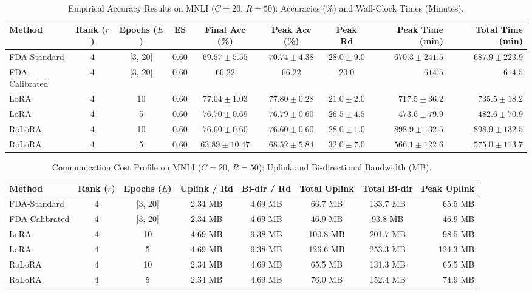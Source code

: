 \documentclass[10pt,a4paper]{article}
\begin{document}
\begin{table}[H]
\centering
\caption{Empirical Accuracy Results on MNLI ($C=20$, $R=50$): Accuracies (\%) and Wall-Clock Times (Minutes).}
\scriptsize
\setlength{\tabcolsep}{3.5pt}
\begin{tabular*}{\textwidth}{@{\extracolsep{\fill}}lccccccrr@{}}
\toprule
\textbf{Method} & \textbf{Rank ($r$)} & \textbf{Epochs ($E$)} & \textbf{ES} & \textbf{Final Acc (\%)} & \textbf{Peak Acc (\%)} & \textbf{Peak Rd} & \textbf{Peak Time (min)} & \textbf{Total Time (min)} \\
\midrule
FDA-Standard & 4 & [3, 20] & 0.60 & $69.57 \pm 5.55$ & $70.74 \pm 4.38$ & $28.0 \pm 9.0$ & $670.3 \pm 241.5$ & $687.9 \pm 223.9$ \\
FDA-Calibrated & 4 & [3, 20] & 0.60 & $66.22$ & $66.22$ & $20.0$ & $614.5$ & $614.5$ \\
LoRA & 4 & 10 & 0.60 & $\mathbf{77.04 \pm 1.03}$ & $\mathbf{77.80 \pm 0.28}$ & $21.0 \pm 2.0$ & $717.5 \pm 36.2$ & $735.5 \pm 18.2$ \\
LoRA & 4 & 5 & 0.60 & $76.70 \pm 0.69$ & $76.79 \pm 0.60$ & $26.5 \pm 4.5$ & $\mathbf{473.6 \pm 79.9}$ & $482.6 \pm 70.9$ \\
RoLoRA & 4 & 10 & 0.60 & $76.60 \pm 0.60$ & $76.60 \pm 0.60$ & $28.0 \pm 1.0$ & $898.9 \pm 132.5$ & $898.9 \pm 132.5$ \\
RoLoRA & 4 & 5 & 0.60 & $63.89 \pm 10.47$ & $68.52 \pm 5.84$ & $32.0 \pm 7.0$ & $566.1 \pm 122.6$ & $575.0 \pm 113.7$ \\
\bottomrule
\end{tabular*}
\end{table}

\begin{table}[H]
\centering
\caption{Communication Cost Profile on MNLI ($C=20$, $R=50$): Uplink and Bi-directional Bandwidth (MB).}
\scriptsize
\setlength{\tabcolsep}{4.0pt}
\begin{tabular*}{\textwidth}{@{\extracolsep{\fill}}lccccccr@{}}
\toprule
\textbf{Method} & \textbf{Rank ($r$)} & \textbf{Epochs ($E$)} & \textbf{Uplink / Rd} & \textbf{Bi-dir / Rd} & \textbf{Total Uplink} & \textbf{Total Bi-dir} & \textbf{Peak Uplink} \\
\midrule
FDA-Standard & 4 & [3, 20] & 2.34 MB & 4.69 MB & 66.7 MB & 133.7 MB & 65.5 MB \\
FDA-Calibrated & 4 & [3, 20] & 2.34 MB & 4.69 MB & 46.9 MB & 93.8 MB & 46.9 MB \\
LoRA & 4 & 10 & 4.69 MB & 9.38 MB & 100.8 MB & 201.7 MB & 98.5 MB \\
LoRA & 4 & 5 & 4.69 MB & 9.38 MB & 126.6 MB & 253.3 MB & 124.3 MB \\
RoLoRA & 4 & 10 & 2.34 MB & 4.69 MB & 65.5 MB & 131.3 MB & 65.5 MB \\
RoLoRA & 4 & 5 & 2.34 MB & 4.69 MB & 76.0 MB & 152.4 MB & 74.9 MB \\
\bottomrule
\end{tabular*}
\end{table}
\end{document}
